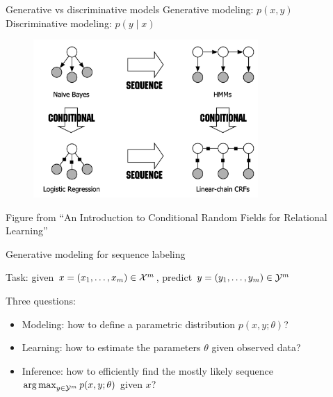 \documentclass[usenames,dvipsnames,notes,11pt,aspectratio=169]{beamer}
\begin{document}
\begin{frame}
    {Generative vs discriminative models}
    Generative modeling: $p(x,y)$\\
    Discriminative modeling: $p(y\mid x)$

    \vspace{-1em}
    \begin{figure}
        \includegraphics[height=6cm]{figures/gen-dist}
    \end{figure}
    \vspace{-1em}

    {\small{Figure from ``An Introduction to Conditional Random Fields for Relational Learning''}}

\end{frame}

\begin{frame}
    {Generative modeling for sequence labeling}

    Task: given $x=(x_1,\ldots,x_m) \in \mathcal{X}^m$, predict $y=(y_1,\ldots,y_m)\in\mathcal{Y}^m$

    Three questions:\\
    \begin{itemize}
        \item Modeling: how to define a parametric  distribution $p(x,y; \theta)$?
        \item Learning: how to estimate the parameters $\theta$ given observed data?
        \item Inference: how to efficiently find the mostly likely sequence $\operatorname*{arg\,max}_{y\in\mathcal{Y}^m} p(x,y;\theta)$ given $x$?
    \end{itemize}
\end{frame}
\end{document}
